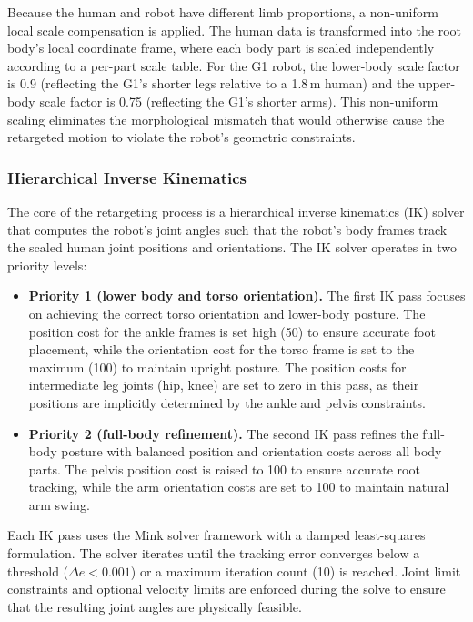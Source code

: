 Because the human and robot have different limb proportions, a non-uniform local scale compensation is applied. The human data is transformed into the root body's local coordinate frame, where each body part is scaled independently according to a per-part scale table. For the G1 robot, the lower-body scale factor is 0.9 (reflecting the G1's shorter legs relative to a 1.8\,m human) and the upper-body scale factor is 0.75 (reflecting the G1's shorter arms). This non-uniform scaling eliminates the morphological mismatch that would otherwise cause the retargeted motion to violate the robot's geometric constraints.

\subsubsection{Hierarchical Inverse Kinematics}

The core of the retargeting process is a hierarchical inverse kinematics (IK) solver that computes the robot's joint angles such that the robot's body frames track the scaled human joint positions and orientations. The IK solver operates in two priority levels:

\begin{itemize}
    \item \textbf{Priority 1 (lower body and torso orientation).} The first IK pass focuses on achieving the correct torso orientation and lower-body posture. The position cost for the ankle frames is set high (50) to ensure accurate foot placement, while the orientation cost for the torso frame is set to the maximum (100) to maintain upright posture. The position costs for intermediate leg joints (hip, knee) are set to zero in this pass, as their positions are implicitly determined by the ankle and pelvis constraints.

    \item \textbf{Priority 2 (full-body refinement).} The second IK pass refines the full-body posture with balanced position and orientation costs across all body parts. The pelvis position cost is raised to 100 to ensure accurate root tracking, while the arm orientation costs are set to 100 to maintain natural arm swing.
\end{itemize}

Each IK pass uses the Mink solver framework with a damped least-squares formulation. The solver iterates until the tracking error converges below a threshold ($\Delta e < 0.001$) or a maximum iteration count (10) is reached. Joint limit constraints and optional velocity limits are enforced during the solve to ensure that the resulting joint angles are physically feasible.

